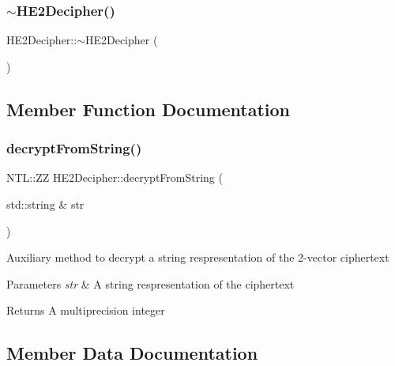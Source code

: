 \subsubsection{\texorpdfstring{$\sim$\+H\+E2\+Decipher()}{~HE2Decipher()}}
{\footnotesize\ttfamily H\+E2\+Decipher\+::$\sim$\+H\+E2\+Decipher (\begin{DoxyParamCaption}{ }\end{DoxyParamCaption})\hspace{0.3cm}{\ttfamily [virtual]}}



\subsection{Member Function Documentation}
\mbox{\label{classHE2Decipher_ac2b41a7a93daf683ab998f77cd59519c}} 
\subsubsection{\texorpdfstring{decrypt\+From\+String()}{decryptFromString()}}
{\footnotesize\ttfamily N\+T\+L\+::\+ZZ H\+E2\+Decipher\+::decrypt\+From\+String (\begin{DoxyParamCaption}\item[{std\+::string \&}]{str }\end{DoxyParamCaption})}

Auxiliary method to decrypt a string respresentation of the 2-\/vector ciphertext 
\begin{DoxyParams}{Parameters}
{\em str} & A string respresentation of the ciphertext \\
\hline
\end{DoxyParams}
\begin{DoxyReturn}{Returns}
A multiprecision integer 
\end{DoxyReturn}


\subsection{Member Data Documentation}
\mbox{\label{classHE2Decipher_a08f53cc4849910945d4ba7f4f16e93a2}} 
